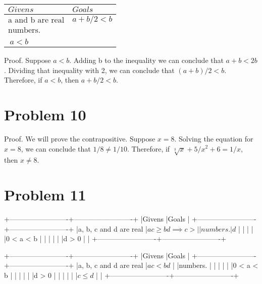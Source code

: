 \documentclass{article}
\begin{document}
\begin{tabular}{| >{$}l<{$} | >{$}l<{$} |}
\hline
Givens & Goals \\
\hline
\text{a and b are real} & a + b/2 < b \\
\text{numbers.} & \\
 & \\
\ a < b & \\
\hline
\end{tabular}


Proof. Suppose $a < b$. Adding b to the inequality we can conclude
that $a + b < 2b$. Dividing that inequality with 2, we can conclude
that $(a + b)/2 < b$. Therefore, if $a < b$, then $a + b / 2 < b$.

\section{Problem 10}

Proof. We will prove the contrapositive. Suppose $x=8$. Solving the
equation for $x=8$, we can conclude that $1/8 \neq 1/10$. Therefore,
if $\sqrt[3]{x} + 5 / x^2 + 6 = 1/x$, then $x \neq 8$.

\section{Problem 11}

+-------------------------+-------------------------+
|Givens                   |Goals                    |
+-------------------------+-------------------------+
|a, b, c and d are real   |$ ac \geq bd \implies c >|
|numbers.                 |d$                       |
|                         |                         |
|0 < a < b                |                         |
|                         |                         |
|d > 0                    |                         |
+-------------------------+-------------------------+

+-------------------------+-------------------------+
|Givens                   |Goals                    |
+-------------------------+-------------------------+
|a, b, c and d are real   |$ ac < bd $              |
|numbers.                 |                         |
|                         |                         |
|0 < a < b                |                         |
|                         |                         |
|d > 0                    |                         |
|                         |                         |
|$c \leq d$               |                         |
+-------------------------+-------------------------+
 
\end{document}
